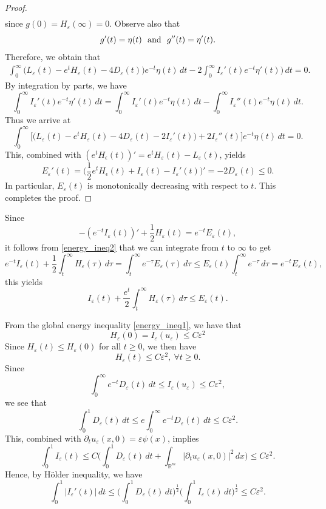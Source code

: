 \documentclass[12pt,twoside,reqno]{amsart}
\theoremstyle{definition}              %
\theoremstyle{remark}                  %
\newcommand{\eps}{\varepsilon}
\renewcommand{\1}{\mathbbm{1}}                                      %
\numberwithin{equation}{section}
\numberwithin{definition}{section}
\numberwithin{theorem}{section}
\numberwithin{remark}{section}
\begin{document}
\begin{proof}
\begin{align*}
\end{align*}
since $g(0)=H_\eps(\infty)=0$.
Observe also that
$$g'(t)=\eta(t)
\ \ {\rm{and}}\ \ g''(t)=\eta'(t).$$
Therefore, we obtain that
\begin{align}
 \int_0^\infty
\big(L_\eps(t)-e^t H_\eps(t)-4D_\eps(t)\big) e^{-t}\eta(t)\,dt-2\int_0^\infty
I_\eps'(t) e^{-t}\eta'(t))\,dt=0.
\end{align}
By integration by parts, we have
\[
\int_0^\infty I_\eps'(t) e^{-t}\eta'(t)\,dt
=\int_0^\infty I_\eps'(t) e^{-t}\eta(t)\,dt
-\int_0^\infty I_\eps''(t) e^{-t}\eta(t)\,dt.
\]
Thus we arrive at
\[
 \int_0^\infty
\Big[\big(L_\eps(t)-e^t H_\eps(t)-4D_\eps(t)-2I_\eps'(t)\big)
+2I_\eps''(t)\Big]e^{-t}\eta(t)\,dt=0.
\]
This, combined with
$(e^t H_\epsilon(t))'
=e^t H_\eps(t)-L_\eps(t)$,
yields
\begin{equation}\label{energy_ineq2}
E_\eps'(t)=\Big(\frac12 e^t H_\epsilon(t)+I_\eps(t)-I_\eps'(t)\Big)'=-2D_\eps(t)\le 0.
\end{equation}
In particular, $E_\eps(t)$ is monotonically decreasing with respect to $t$. This completes the proof.
\end{proof}

\medskip
Since
\[
-(e^{-t}I_\eps(t))'+\frac12 H_\eps(t)
=e^{-t}E_\eps(t),
\]
it follows from \eqref{energy_ineq2} that we can integrate from $t$ to $\infty$ to get
\[
e^{-t}I_\eps(t)
+\frac12\int_t^\infty H_\eps(\tau)\,d\tau 
=\int_t^\infty e^{-\tau} E_\eps(\tau)\,d\tau
\le E_\eps(t) \int_t^\infty e^{-\tau}\,d\tau
=e^{-t}E_\eps(t),
\]
this yields
\begin{equation}\label{non-negativity}
I_\eps(t)+\frac{e^t}2\int_t^\infty H_\eps(\tau)\,d\tau\le E_\eps(t).
\end{equation}

From the global energy inequality \eqref{energy_ineq1}, we have that
$$
H_\eps(0)=I_\eps(u_\eps)\le C\eps^2
$$
Since $H_\eps(t)\le H_\eps(0)$ for all
$t\ge 0$, we then have
\begin{equation}\label{E1}
H_\eps(t)\le C\eps^2, \ \forall t\ge 0.
\end{equation}
Since
$$
\int_0^\infty e^{-t}D_\eps(t)\,dt\le I_\eps(u_\eps)\le C\eps^2,
$$
we see that
\begin{equation}\label{E2}
\int_0^1 D_\eps(t)\,dt\le e\int_0^\infty e^{-t}D_\eps(t)\,dt\le C\eps^2.
\end{equation}
This, combined with $\partial_tu_\eps(x,0)=\eps\psi(x)$, implies
\begin{equation}\label{E3}
\int_0^1 I_\eps(t)
\le C\big(\int_0^1 D_\eps(t)\,dt+\int_{\mathbb{R}^m} |\partial_tu_\eps(x,0)|^2\,dx\big)
\le C\eps^2.
\end{equation}
Hence, by H\"older inequality, we have
\begin{equation}\label{E4}
\int_0^1 |I_\eps'(t)|\,dt
\le \big(\int_0^1 D_\eps(t)\,dt\big)^\frac12\big(\int_0^1 I_\eps(t)\,dt\big)^\frac12\le C\eps^2.
\end{equation}
\end{document}
